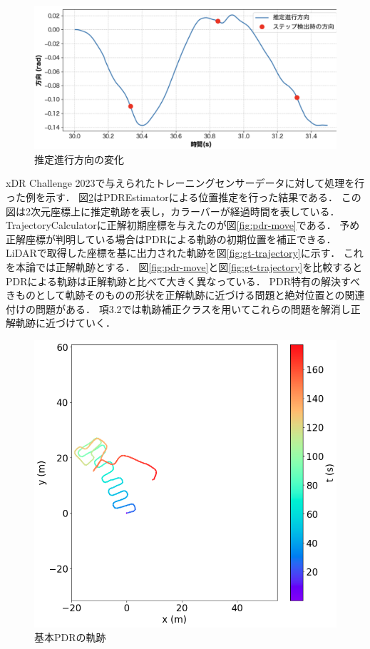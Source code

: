 \begin{figure}[ht]
	\centering
	\includegraphics[width=\linewidth]{image/step_timing_angle.jpg}
	\caption{推定進行方向の変化}    \label{fig:step_timing}
\end{figure}


xDR Challenge 2023で与えられたトレーニングセンサーデータに対して処理を行った例を示す．
図\ref{fig:pdr}はPDREstimatorによる位置推定を行った結果である．
この図は2次元座標上に推定軌跡を表し，カラーバーが経過時間を表している．
TrajectoryCalculatorに正解初期座標を与えたのが図\ref{fig:pdr-move}である．
予め正解座標が判明している場合はPDRによる軌跡の初期位置を補正できる．
LiDARで取得した座標を基に出力された軌跡を図\ref{fig:gt-trajectory}に示す．
これを本論では正解軌跡とする．
図\ref{fig:pdr-move}と図\ref*{fig:gt-trajectory}を比較すると
PDRによる軌跡は正解軌跡と比べて大きく異なっている．
PDR特有の解決すべきものとして軌跡そのものの形状を正解軌跡に近づける問題と絶対位置との関連付けの問題がある．
項3.2では軌跡補正クラスを用いてこれらの問題を解消し正解軌跡に近づけていく．

\begin{figure}[ht]
	\centering
	\includegraphics[width=\linewidth]{image/pdr.jpg}
	\caption{基本PDRの軌跡}    \label{fig:pdr}
\end{figure}


